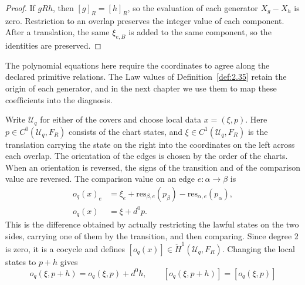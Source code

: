 \begin{proof}

If $gRh$, then $[g]_R=[h]_R$, so the evaluation of each generator $X_g-X_h$ is zero.
Restriction to an overlap preserves the integer value of each component. After a
translation, the same $\xi_{e,B}$ is added to the same component, so the identities are
preserved.

\end{proof}

The polynomial equations here require the coordinates to agree along the declared
primitive relations. The Law values of Definition~\ref{def:2.35} retain the origin of
each generator, and in the next chapter we use them to map these coefficients into the
diagnosis.

\begin{proposition}\label{prop:2.41}

Write $\mathcal{U}_q$ for either of the covers and choose local data $x=(\xi,p)$. Here
$p\in C^0(\mathcal{U}_q,F_R)$ consists of the chart states, and
$\xi\in C^1(\mathcal{U}_q,F_R)$ is the translation carrying the state on the right into
the coordinates on the left across each overlap. The orientation of the edges is chosen
by the order of the charts. When an orientation is reversed, the signs of the transition
and of the comparison value are reversed. The comparison value on an edge
$e:\alpha\to\beta$ is
\begin{equation*}
\begin{aligned}
o_q(x)_e&=\xi_e+\mathrm{res}_{\beta,e}(p_\beta)
-\mathrm{res}_{\alpha,e}(p_\alpha),\\
o_q(x)&=\xi+d^0p.
\end{aligned}
\tag{2.26}\label{eq:2.26}
\end{equation*}
This is the difference obtained by actually restricting the lawful states on the two
sides, carrying one of them by the transition, and then comparing. Since degree 2 is
zero, it is a cocycle and defines $[o_q(x)]\in\check H^1(\mathcal{U}_q,F_R)$. Changing
the local states to $p+h$ gives
\begin{equation*}
o_q(\xi,p+h)=o_q(\xi,p)+d^0h,
\qquad [o_q(\xi,p+h)]=[o_q(\xi,p)]
\tag{2.27}\label{eq:2.27}
\end{equation*}
\end{proposition}

